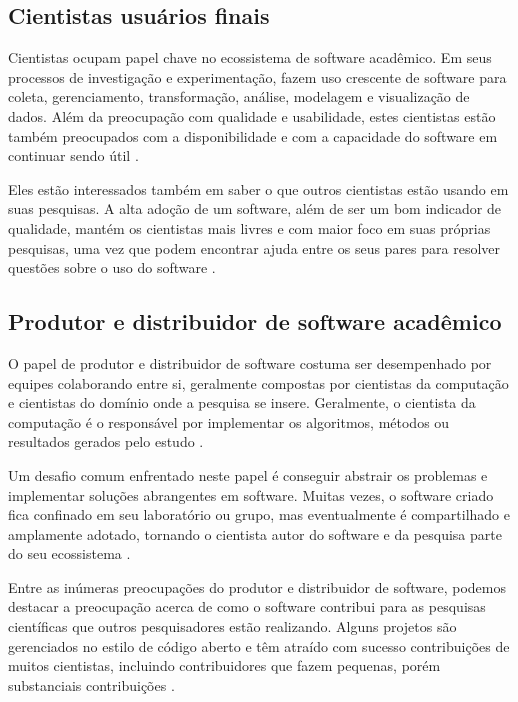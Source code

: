 \subsection{Cientistas usuários finais}

Cientistas ocupam papel chave no ecossistema de software acadêmico.  Em seus
processos de investigação e experimentação, fazem uso crescente de software
para coleta, gerenciamento, transformação, análise, modelagem e visualização de
dados. Além da preocupação com qualidade e usabilidade, estes cientistas estão
também preocupados com a disponibilidade e com a capacidade do software em
continuar sendo útil \cite{howison2015understanding}.

Eles estão interessados também em saber o que outros
cientistas estão usando em suas pesquisas. A alta adoção de um software, além
de ser um bom indicador de qualidade, mantém os cientistas mais livres e com
maior foco em suas próprias pesquisas, uma vez que podem encontrar ajuda entre
os seus pares para resolver questões sobre o uso do software
\cite{howison2015understanding}.

\subsection{Produtor e distribuidor de software acadêmico}

O papel de produtor e distribuidor de software costuma ser desempenhado por
equipes colaborando entre si, geralmente compostas por cientistas da computação
e cientistas do domínio onde a pesquisa se insere.
Geralmente, o cientista da computação é o responsável por implementar os
algoritmos, métodos ou resultados gerados pelo estudo
\cite{howison2015understanding}.

Um desafio comum enfrentado neste papel é conseguir abstrair os problemas e
implementar soluções abrangentes em software.
Muitas vezes, o software criado fica confinado em seu laboratório ou grupo, mas
eventualmente é compartilhado e amplamente adotado, tornando o cientista autor
do software e da pesquisa parte do seu ecossistema \cite{howison2015understanding}.

Entre as inúmeras preocupações do produtor e distribuidor de software, podemos
destacar a preocupação acerca de como o software contribui para as
pesquisas científicas que outros pesquisadores estão realizando.
Alguns projetos são gerenciados no estilo de código aberto e têm atraído com
sucesso contribuições de muitos cientistas, incluindo contribuidores que
fazem pequenas, porém substanciais contribuições
\cite{howison2015understanding}.

